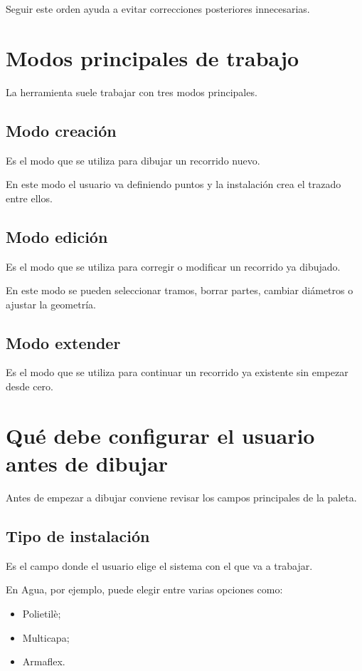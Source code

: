 \documentclass[12pt,a4paper]{article}
\begin{document}
Seguir este orden ayuda a evitar correcciones posteriores innecesarias.

\section{Modos principales de trabajo}

La herramienta suele trabajar con tres modos principales.

\subsection{Modo creación}

Es el modo que se utiliza para dibujar un recorrido nuevo.

En este modo el usuario va definiendo puntos y la instalación crea el trazado entre ellos.

\subsection{Modo edición}

Es el modo que se utiliza para corregir o modificar un recorrido ya dibujado.

En este modo se pueden seleccionar tramos, borrar partes, cambiar diámetros o ajustar la geometría.

\subsection{Modo extender}

Es el modo que se utiliza para continuar un recorrido ya existente sin empezar desde cero.

\section{Qué debe configurar el usuario antes de dibujar}

Antes de empezar a dibujar conviene revisar los campos principales de la paleta.

\subsection{Tipo de instalación}

Es el campo donde el usuario elige el sistema con el que va a trabajar.

En Agua, por ejemplo, puede elegir entre varias opciones como:

\begin{itemize}
\item Polietilè;
\item Multicapa;
\item Armaflex.
\end{itemize}
\end{document}

